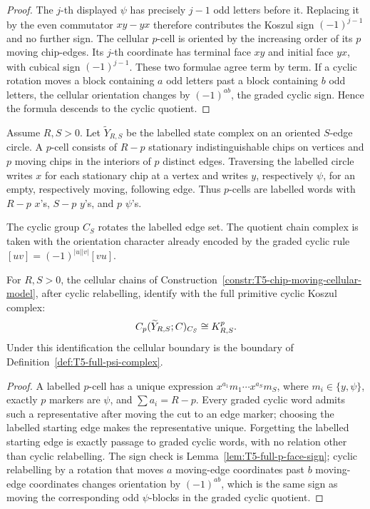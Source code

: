 \begin{proof}
  The \(j\)-th displayed \(\psi\) has precisely \(j-1\) odd letters before
  it.  Replacing it by the even commutator \(xy-yx\) therefore contributes
  the Koszul sign \((-1)^{j-1}\) and no further sign.  The cellular
  \(p\)-cell is oriented by the increasing order of its \(p\) moving
  chip-edges.  Its \(j\)-th coordinate has terminal face \(xy\) and
  initial face \(yx\), with cubical sign \((-1)^{j-1}\).  These two
  formulae agree term by term.  If a cyclic rotation moves a block
  containing \(a\) odd letters past a block containing \(b\) odd letters,
  the cellular orientation changes by \((-1)^{ab}\), the graded cyclic
  sign.  Hence the formula descends to the cyclic quotient.
\end{proof}

\begin{constr}\label{constr:T5-chip-moving-cellular-model}
  Assume \(R,S>0\).  Let \(\widetilde Y_{R,S}\) be the labelled state
  complex on an oriented \(S\)-edge circle.  A \(p\)-cell consists of
  \(R-p\) stationary indistinguishable chips on vertices and \(p\)
  moving chips in the interiors of \(p\) distinct edges.  Traversing the
  labelled circle writes \(x\) for each stationary chip at a vertex and
  writes \(y\), respectively \(\psi\), for an empty, respectively moving,
  following edge.  Thus \(p\)-cells are labelled words with
  \(R-p\) \(x\)'s, \(S-p\) \(y\)'s, and \(p\) \(\psi\)'s.

  The cyclic group \(C_S\) rotates the labelled edge set.  The quotient
  chain complex is taken with the orientation character already encoded
  by the graded cyclic rule
  \([uv]=(-1)^{|u||v|}[vu]\).
\end{constr}

\begin{lem}\label{lem:T5-cellular-chain-identification}
  For \(R,S>0\), the cellular chains of
  Construction~\ref{constr:T5-chip-moving-cellular-model}, after cyclic
  relabelling, identify with the full primitive cyclic Koszul complex:
  \[
    C_p(\widetilde Y_{R,S};C)_{C_S}\cong K^p_{R,S}.
  \]
  Under this identification the cellular boundary is the boundary of
  Definition~\ref{def:T5-full-psi-complex}.
\end{lem}

\begin{proof}
  A labelled \(p\)-cell has a unique expression
  \(x^{a_1}m_1\cdots x^{a_S}m_S\), where
  \(m_i\in\{y,\psi\}\), exactly \(p\) markers are \(\psi\), and
  \(\sum a_i=R-p\).  Every graded cyclic word admits such a representative
  after moving the cut to an edge marker; choosing the labelled starting
  edge makes the representative unique.  Forgetting the labelled starting
  edge is exactly passage to graded cyclic words, with no relation other
  than cyclic relabelling.  The sign check is
  Lemma~\ref{lem:T5-full-p-face-sign}; cyclic relabelling by a rotation
  that moves \(a\) moving-edge coordinates past \(b\) moving-edge
  coordinates changes orientation by \((-1)^{ab}\), which is the same
  sign as moving the corresponding odd \(\psi\)-blocks in the graded
  cyclic quotient.
\end{proof}

